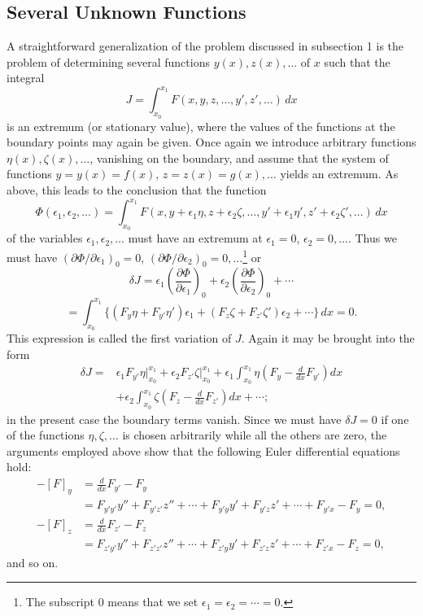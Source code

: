\subsection{Several Unknown Functions}
A straightforward generalization of the problem discussed in subsection 1 is the problem of determining several functions $y(x),z(x),\ldots$ of $x$ such that the integral
\begin{equation}\tag{16}
J=\int_{x_0}^{x_1}F(x,y,z,\ldots,y',z',\ldots)\,dx
\end{equation}
is an extremum (or stationary value), where the values of the functions at the boundary points may again be given. Once again we introduce arbitrary functions $\eta(x),\zeta(x),\ldots$, vanishing on the boundary, and assume that the system of functions $y=y(x)=f(x)$, $z=z(x)=g(x),\ldots$ yields an extremum. As above, this leads to the conclusion that the function
\[
\Phi(\epsilon_1,\epsilon_2,\ldots)
=\int_{x_0}^{x_1}F(x,y+\epsilon_1\eta,z+\epsilon_2\zeta,\ldots,
 y'+\epsilon_1\eta',z'+\epsilon_2\zeta',\ldots)\,dx
\]
of the variables $\epsilon_1,\epsilon_2,\ldots$ must have an extremum at $\epsilon_1=0$, $\epsilon_2=0,\ldots$. Thus we must have $(\partial\Phi/\partial\epsilon_1)_0=0$, $(\partial\Phi/\partial\epsilon_2)_0=0,\ldots$\footnote{The subscript 0 means that we set $\epsilon_1=\epsilon_2=\cdots=0$.} or
\[
\delta J
=\epsilon_1\left(\frac{\partial\Phi}{\partial\epsilon_1}\right)_0
 +\epsilon_2\left(\frac{\partial\Phi}{\partial\epsilon_2}\right)_0+\cdots
\]
\[
=\int_{x_0}^{x_1}\{(F_y\eta+F_{y'}\eta')\epsilon_1
 +(F_z\zeta+F_{z'}\zeta')\epsilon_2+\cdots\}\,dx=0.
\]
This expression is called the first variation of $J$. Again it may be brought into the form
\begin{align}\tag{17}
\delta J={}&\epsilon_1F_{y'}\eta\big|_{x_0}^{x_1}
+\epsilon_2F_{z'}\zeta\big|_{x_0}^{x_1}
+\epsilon_1\int_{x_0}^{x_1}\eta\left(F_y-\frac{d}{dx}F_{y'}\right)dx\\
&+\epsilon_2\int_{x_0}^{x_1}\zeta\left(F_z-\frac{d}{dx}F_{z'}\right)dx+\cdots;
\end{align}
in the present case the boundary terms vanish. Since we must have $\delta J=0$ if one of the functions $\eta,\zeta,\ldots$ is chosen arbitrarily while all the others are zero, the arguments employed above show that the following Euler differential equations hold:
\begin{align}\tag{18}
-[F]_y&=\frac{d}{dx}F_{y'}-F_y\\
&=F_{y'y'}y''+F_{y'z'}z''+\cdots+F_{y'y}y'+F_{y'z}z'+\cdots+F_{y'x}-F_y=0,\\
-[F]_z&=\frac{d}{dx}F_{z'}-F_z\\
&=F_{z'y'}y''+F_{z'z'}z''+\cdots+F_{z'y}y'+F_{z'z}z'+\cdots+F_{z'x}-F_z=0,
\end{align}
and so on.

